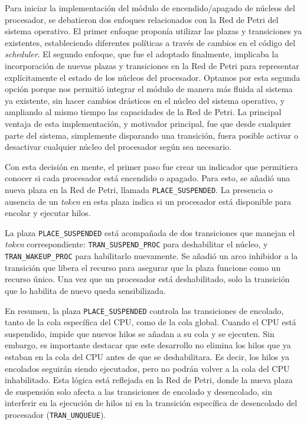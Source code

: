 Para iniciar la implementación del módulo de encendido/apagado de núcleos del procesador, se debatieron dos enfoques relacionados con la Red de Petri del sistema operativo. El primer enfoque proponía utilizar las plazas y transiciones ya existentes, estableciendo diferentes políticas a través de cambios en el código del \textit{scheduler}. El segundo enfoque, que fue el adoptado finalmente, implicaba la incorporación de nuevas plazas y transiciones en la Red de Petri para representar explícitamente el estado de los núcleos del procesador. Optamos por esta segunda opción porque nos permitió integrar el módulo de manera más fluida al sistema ya existente, sin hacer cambios drásticos en el núcleo del sistema operativo, y ampliando al mismo tiempo las capacidades de la Red de Petri. La principal ventaja de esta implementación, y motivador principal, fue que desde cualquier parte del sistema, simplemente disparando una transición, fuera posible activar o desactivar cualquier núcleo del procesador según sea necesario.

Con esta decisión en mente, el primer paso fue crear un indicador que permitiera conocer si cada procesador está encendido o apagado. Para esto, se añadió una nueva plaza en la Red de Petri, llamada \texttt{PLACE\_SUSPENDED}. La presencia o ausencia de un \textit{token} en esta plaza indica si un procesador está disponible para encolar y ejecutar hilos.

La plaza \texttt{PLACE\_SUSPENDED} está acompañada de dos transiciones que manejan el \textit{token} correspondiente: \texttt{TRAN\_SUSPEND\_PROC} para deshabilitar el núcleo, y \texttt{TRAN\_WAKEUP\_PROC} para habilitarlo nuevamente. Se añadió un arco inhibidor a la transición que libera el recurso para asegurar que la plaza funcione como un recurso único. Una vez que un procesador está deshabilitado, solo la transición que lo habilita de nuevo queda sensibilizada.

En resumen, la plaza \texttt{PLACE\_SUSPENDED} controla las transiciones de encolado, tanto de la cola específica del CPU, como de la cola global. Cuando el CPU está suspendido, impide que nuevos hilos se añadan a su cola y se ejecuten. Sin embargo, es importante destacar que este desarrollo no elimina los hilos que ya estaban en la cola del CPU antes de que se deshabilitara. Es decir, los hilos ya encolados seguirán siendo ejecutados, pero no podrán volver a la cola del CPU inhabilitado. Esta lógica está reflejada en la Red de Petri, donde la nueva plaza de suspensión solo afecta a las transiciones de encolado y desencolado, sin interferir en la ejecución de hilos ni en la transición específica de desencolado del procesador (\texttt{TRAN\_UNQUEUE}).

